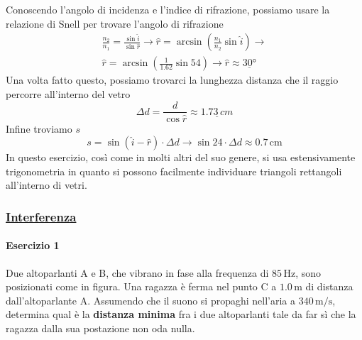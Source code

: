 Conoscendo l'angolo di incidenza e l'indice di rifrazione, possiamo usare la relazione di Snell per
trovare l'angolo di rifrazione
\begin{align*}
\frac{n_2}{n_1} = \frac{\sin\hat{i}}{\sin\hat{r}} \rightarrow
\hat{r} = \arcsin\left(\frac{n_1}{n_2}\sin\hat{i}\right) \rightarrow\\
\hat{r} = \arcsin\left(\frac{1}{1.62}\sin54\right) \rightarrow
\hat{r} \approx \underline{\ang{30}}
\end{align*}
Una volta fatto questo, possiamo trovarci la lunghezza distanza che il raggio percorre all'interno
del vetro
\begin{equation*}
\Delta d = \frac{d}{\cos\hat{r}} \approx \underline{1.73\,cm}
\end{equation*}
Infine troviamo $s$
\begin{equation*}
s = \sin(\hat{i}-\hat{r})\cdot\Delta d \rightarrow \sin24\cdot\Delta d \approx \boxed{0.7\,\text{cm}}
\end{equation*}
In questo esercizio, così come in molti altri del suo genere, si usa estensivamente trigonometria
in quanto si possono facilmente individuare triangoli rettangoli all'interno di vetri.

\subsubsection*{\hyperref[subsec:onde:interferenza]{Interferenza}}\label{ex:interferenza}
\paragraph{Esercizio 1}
Due altoparlanti A e B, che vibrano in fase alla frequenza di $85\,\text{Hz}$, sono posizionati come 
in figura. Una ragazza è ferma nel punto C a $1.0\,\text{m}$ di distanza dall'altoparlante A. 
Assumendo che il suono si propaghi nell'aria a $340\,\text{m/s}$, determina qual è la 
\textbf{distanza minima} fra i due altoparlanti tale da far sì che la ragazza dalla sua postazione 
non oda nulla.
\begin{center}
\end{center}
\divisor

